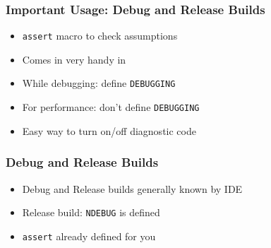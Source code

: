 \documentclass{../ucll-slides}
\begin{document}
\begin{frame}
  \frametitle{Important Usage: Debug and Release Builds}
  \begin{itemize}
    \item {\tt assert} macro to check assumptions
    \item Comes in very handy in  \cpp
    \item While debugging: define {\tt DEBUGGING}
    \item For performance: don't define {\tt DEBUGGING}
    \item Easy way to turn on/off diagnostic code
  \end{itemize}
\end{frame}

\begin{frame}
  \frametitle{Debug and Release Builds}
  \begin{itemize}
    \item Debug and Release builds generally known by IDE
    \item Release build: {\tt NDEBUG} is defined
    \item {\tt assert} already defined for you
  \end{itemize}
\end{frame}
\end{document}
